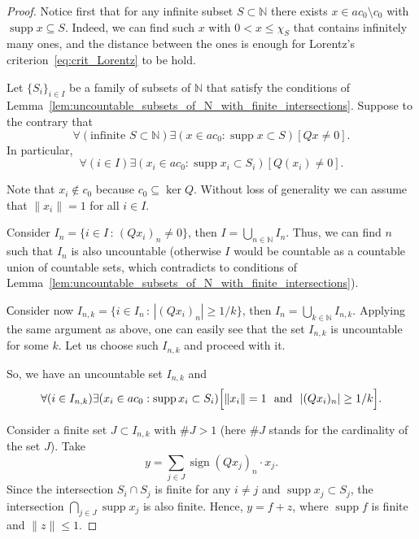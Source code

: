 \documentclass[a4paper,10pt]{article} %
\DeclareMathOperator{\supp}{supp}
\theoremstyle{plain}
\theoremstyle{definition}
\begin{document}
\begin{proof}
	Notice first that for any infinite subset $S \subset \mathbb{N}$
	there exists $x\in ac_0\setminus c_0$ with $\supp x \subseteq S$.
	Indeed, we can find such $x$ with $0 < x \leq \chi_S$
	that contains infinitely many ones, and the distance between the ones
	is enough for Lorentz's criterion~\eqref{eq:crit_Lorentz} to be hold.



	Let $\{S_i\}_{i \in I}$ be a family of subsets of $\mathbb{N}$
	that satisfy the conditions of Lemma~\ref{lem:uncountable_subsets_of_N_with_finite_intersections}.
	Suppose to the contrary that
	\begin{equation}
		\forall(\mbox{infinite }S\subset\mathbb{N})\exists(x \in ac_0 : \supp x \subset S)[Qx \neq 0]
		.
	\end{equation}
	In particular,
	\begin{equation}
		\forall(i\in I)\exists(x_i \in ac_0 : \supp x_i \subset S_i)[Q(x_i) \neq 0]
		.
	\end{equation}

	Note that $x_i \notin c_0$ because $c_0\subseteq \ker Q$.
	Without loss of generality we can assume that $\|x_i\|=1$ for all $i \in I$.

	Consider $I_n = \{i \in I\,:\,(Qx_i)_n \neq 0\}$,
	then $I = \bigcup\limits_{n\in\mathbb{N}} I_n$.
	Thus, we can find $n$ such that $I_n$ is also uncountable
	(otherwise $I$ would be countable as a countable union of countable sets,
	which contradicts to conditions of Lemma~\ref{lem:uncountable_subsets_of_N_with_finite_intersections}).

	Сonsider now $I_{n,k} = \{i \in I_n\,:\,|(Qx_i)_n| \geq 1/k\}$,
	then $I_n = \bigcup\limits_{k\in\mathbb{N}} I_{n,k}$.
	Applying the same argument as above, one can easily see that the set $I_{n,k}$ is uncountable for some $k$.
	Let us choose such $I_{n,k}$ and proceed with it.

	So, we have an uncountable set $I_{n,k}$ and
	\begin{equation}
		\forall(i\in I_{n,k})\exists(x_i \in ac_0 : \supp x_i \subset S_i)\Bigl[\|x_i\|=1 \mbox{~~and~~} |(Qx_i)_n| \geq 1/k\Bigr]
		.
	\end{equation}

	Consider a finite set $J \subset I_{n,k}$ with $\#J>1$
	(here $\#J$ stands for the cardinality of the set $J$).
	Take
	\begin{equation}
		y = \sum_{j \in J} \operatorname{sign}{(Qx_j)_n} \cdot x_j
		.
	\end{equation}
	Since the intersection $S_i \cap S_j$ is finite for any $i \neq j$ and
	$\supp x_j \subset S_j$,
	the intersection $\bigcap\limits_{j\in J} \supp x_j$ is also finite.
	Hence, $y = f + z$,
	where $\supp f$ is finite and $\|z\| \leq 1$.


\end{proof}
\end{document}
